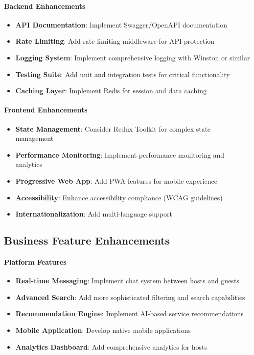 \documentclass[12pt,a4paper]{article}
\begin{document}
\paragraph{Backend Enhancements}
\begin{itemize}
\item \textbf{API Documentation}: Implement Swagger/OpenAPI documentation
\item \textbf{Rate Limiting}: Add rate limiting middleware for API protection
\item \textbf{Logging System}: Implement comprehensive logging with Winston or similar
\item \textbf{Testing Suite}: Add unit and integration tests for critical functionality
\item \textbf{Caching Layer}: Implement Redis for session and data caching
\end{itemize}

\paragraph{Frontend Enhancements}
\begin{itemize}
\item \textbf{State Management}: Consider Redux Toolkit for complex state management
\item \textbf{Performance Monitoring}: Implement performance monitoring and analytics
\item \textbf{Progressive Web App}: Add PWA features for mobile experience
\item \textbf{Accessibility}: Enhance accessibility compliance (WCAG guidelines)
\item \textbf{Internationalization}: Add multi-language support
\end{itemize}

\subsection{Business Feature Enhancements}
\label{subsec:business-enhancements}

\paragraph{Platform Features}
\begin{itemize}
\item \textbf{Real-time Messaging}: Implement chat system between hosts and guests
\item \textbf{Advanced Search}: Add more sophisticated filtering and search capabilities
\item \textbf{Recommendation Engine}: Implement AI-based service recommendations
\item \textbf{Mobile Application}: Develop native mobile applications
\item \textbf{Analytics Dashboard}: Add comprehensive analytics for hosts
\end{itemize}
\end{document}
